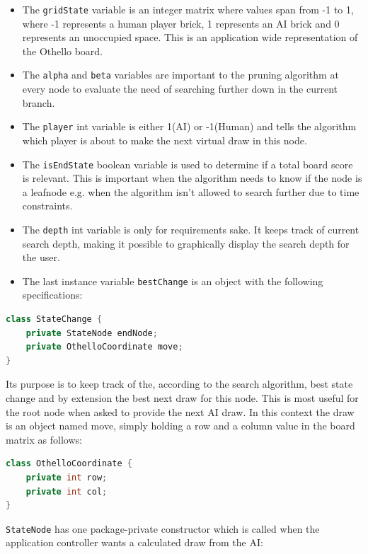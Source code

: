 \documentclass{article}
\begin{document}
\begin{itemize}
\item The \verb|gridState| variable is an integer matrix where values span from -1 to 1,
where -1 represents a human player brick, 1 represents an AI brick and 0 represents
an unoccupied space. This is an application wide representation of the Othello board.

 \item The \verb|alpha| and \verb|beta| variables are important to the pruning algorithm at
every node to evaluate the need of searching further down in the current branch.

\item The \verb|player| int variable is either 1(AI) or -1(Human) and tells the algorithm
which player is about to make the next virtual draw in this node.

\item The \verb|isEndState| boolean variable is used to determine if a total board score
is relevant. This is important when the algorithm needs to know if the node is a
leafnode e.g. when the algorithm isn't allowed to search further due to time constraints.

\item The \verb|depth| int variable is only for requirements sake. It keeps
track of current search depth, making it possible to graphically display the search depth for the user.

\item The last instance variable \verb|bestChange| is an object with the following specifications:
\end{itemize}

\begin{lstlisting}[language=Java]
class StateChange {
    private StateNode endNode;
    private OthelloCoordinate move;
}
\end{lstlisting}

Its purpose is to keep track of the, according to the search algorithm, best state
change and by extension the best next draw for this node. This is most useful
for the root node when asked to provide the next AI draw. In this context the draw
is an object named move, simply holding a row and a column value in the board matrix as follows:
\begin{lstlisting}[language=Java]
class OthelloCoordinate {
    private int row;
    private int col;
}
\end{lstlisting}

\verb|StateNode| has one package-private constructor which is called when the application
controller wants a calculated draw from the AI:
\end{document}
